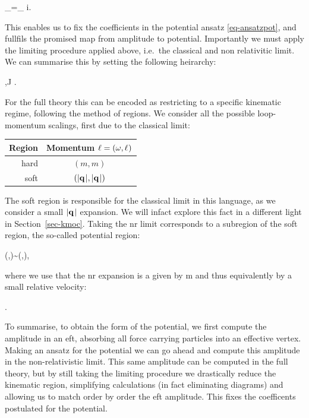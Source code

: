 \documentclass[
  10pt,
  a4paper,
  DIV=11,
  numbers=noendperiod,
  twoside]{scrreprt}
\let\[\relax \let\]\relax %
\DeclareRobustCommand{\[}{\begin{equation}}
\DeclareRobustCommand{\]}{\end{equation}}
\begin{document}
\[
\ampl[(i)]_=\ampl[(i)]_ \quad \forall i.
\]

This enables us to fix the coefficients in the potential ansatz
\ref{eq-ansatzpot}, and fullfils the promised map from amplitude to
potential. Importantly we must apply the limiting procedure applied
above, i.e.~the classical and non relativitic limit. We can summarise
this by setting the following heirarchy:

\[
\mass[1],\mass[2]\ll J  \ll {}.
\]

For the full theory this can be encoded as restricting to a specific
kinematic regime, following the method of regions. We consider all the
possible loop-momentum scalings, first due to the classical limit:

\begin{longtable}[]{@{}rc@{}}
\toprule()
Region & Momentum \(\ell = (\omega,\mathbf{{\ell}}_{})\) \\
\midrule()
\endhead
hard & \((m,m)\) \\
soft & \((\vert\mathbf{{q_{}}}_{} \vert,\vert\mathbf{{q_{}}}_{} \vert)\) \\
\bottomrule()
\end{longtable}

The soft region is responsible for the classical limit in this language,
as we consider a small \(\vert\mathbf{{q_{}}}_{} \vert\) expansion. We will infact
explore this fact in a different light in Section~\ref{sec-kmoc}. Taking
the \gls{nr} limit corresponds to a subregion of the soft region, the
so-called potential region:

\[ (\omega,\tv{\ell})\sim (\abs{\tv{\tm}},\abs{\tv{\tm}}),\]

where we use that the \gls{nr} expansion is a given by
\[\abs{\tv{\emom}}\ll m\] and thus equivalently by a small relative velocity:

\[ \abs{\tv{\vel}}.\]

To summarise, to obtain the form of the potential, we first compute the
amplitude in an \gls{eft}, absorbing all force carrying particles into
an effective vertex. Making an ansatz for the potential we can go ahead
and compute this amplitude in the non-relativistic limit. This same
amplitude can be computed in the full theory, but by still taking the
limiting procedure we drastically reduce the kinematic region,
simplifying calculations (in fact eliminating diagrams) and allowing us
to match order by order the \gls{eft} amplitude. This fixes the
coefficents postulated for the potential.
\end{document}
